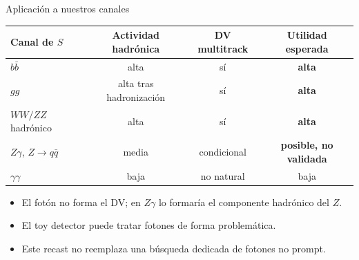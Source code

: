 \documentclass[aspectratio=169,10pt]{beamer}
\newcommand{\evidence}[1]{\textcolor{ok}{\textbf{#1}}}
\newcommand{\pending}[1]{\textcolor{warn}{\textbf{#1}}}
\begin{document}
\begin{frame}{Aplicación a nuestros canales}
  \small
  \begin{tabular}{lccc}
    \toprule
    Canal de $S$ & Actividad hadrónica & DV multitrack & Utilidad esperada\\
    \midrule
    $b\bar b$ & alta & sí & \evidence{alta}\\
    $gg$ & alta tras hadronización & sí & \evidence{alta}\\
    $WW/ZZ$ hadrónico & alta & sí & \evidence{alta}\\
    $Z\gamma$, $Z\to q\bar q$ & media & condicional & \pending{posible, no validada}\\
    $\gamma\gamma$ & baja & no natural & baja\\
    \bottomrule
  \end{tabular}
  \vspace{0.8em}
  \begin{itemize}
    \item El fotón no forma el DV; en $Z\gamma$ lo formaría el componente hadrónico del $Z$.
    \item El toy detector puede tratar fotones de forma problemática.
    \item Este recast no reemplaza una búsqueda dedicada de fotones no prompt.
  \end{itemize}
\end{frame}
\end{document}
